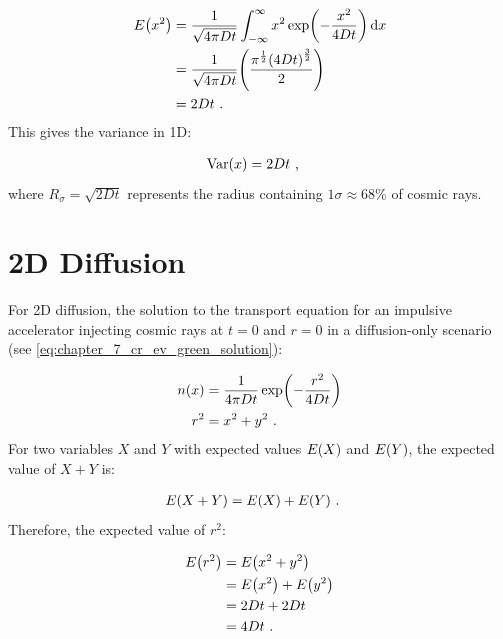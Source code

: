\begin{equation}
    \begin{aligned}
        E\qty(x^2)&=\frac{1}{\sqrt{4\pi Dt}}\int_{-\infty}^\infty x^2\exp(-\frac{x^2}{4Dt})\dd{x} \\
        &=\frac{1}{\sqrt{4\pi Dt}} \qty(\frac{\pi^\frac{1}{2} \qty(4Dt)^\frac{3}{2}}{2}) \\
        &=2Dt\text{ .} 
    \end{aligned}
\end{equation}
\noindent This gives the variance in 1D:

\begin{equation}
    \begin{aligned}
        \mathrm{Var}\qty(x)&=2Dt\text{ ,} 
    \end{aligned}
\end{equation}
\noindent where $R_\sigma=\sqrt{2Dt}$ represents the radius containing $1\sigma\approx 68\%$ of cosmic rays.

\section{2D Diffusion}

For 2D diffusion, the solution to the transport equation for an impulsive accelerator injecting cosmic rays at $t=0$ and $r=0$ in a diffusion-only scenario (see \autoref{eq:chapter_7_cr_ev_green_solution}):

\begin{equation}
    \begin{aligned}
        n\qty(x)&=\frac{1}{4\pi Dt}\exp(-\frac{r^2}{4Dt}) \\
        r^2&=x^2+y^2\text{ .} 
    \end{aligned}
\end{equation}
For two variables $X$ and $Y$ with expected values $E\qty(X)$ and $E\qty(Y)$, the expected value of $X+Y$ is:

\begin{equation}
    \begin{aligned}
        E\qty(X+Y)&=E\qty(X)+E\qty(Y)\text{ .} 
    \end{aligned}
\end{equation}
\noindent Therefore, the expected value of $r^2$:

\begin{equation}
    \begin{aligned}
        E\qty(r^2)&=E\qty(x^2+y^2) \\
        &=E\qty(x^2)+E\qty(y^2) \\
        &= 2Dt + 2Dt \\
        &=4Dt\text{ .} 
    \end{aligned}
\end{equation}

